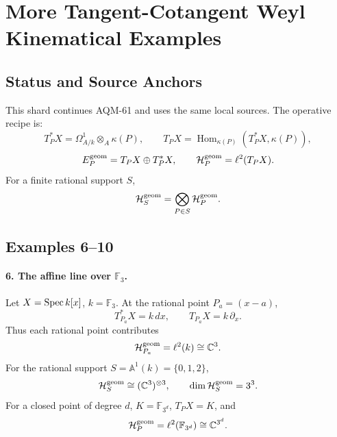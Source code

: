 
\section{More Tangent-Cotangent Weyl Kinematical Examples}
\label{sec:tangent-cotangent-weyl-kinematics-more-examples}

\subsection{Status and Source Anchors}

This shard continues AQM-61 and uses the same local sources.  The operative
recipe is:
\[
  T_P^*X=\Omega^1_{A/k}\otimes_A\kappa(P),\qquad
  T_PX=\operatorname{Hom}_{\kappa(P)}(T_P^*X,\kappa(P)),
\]
\[
  E_P^{\rm geom}=T_PX\oplus T_P^*X,\qquad
  \mathcal H_P^{\rm geom}=\ell^2(T_PX).
\]
For a finite rational support \(S\),
\[
  \mathcal H_S^{\rm geom}=\bigotimes_{P\in S}\mathcal H_P^{\rm geom}.
\]

\subsection{Examples 6--10}

\paragraph{6. The affine line over \(\mathbb F_3\).}
Let \(X=\operatorname{Spec} k[x]\), \(k=\mathbb F_3\).  At the rational point \(P_a=(x-a)\),
\[
  T_{P_a}^*X=k\,dx,\qquad T_{P_a}X=k\,\partial_x.
\]
Thus each rational point contributes
\[
  \mathcal H_{P_a}^{\rm geom}=\ell^2(k)\cong\mathbb C^3.
\]
For the rational support \(S=\mathbb A^1(k)=\{0,1,2\}\),
\[
  \mathcal H_S^{\rm geom}\cong(\mathbb C^3)^{\otimes3},
  \qquad \dim\mathcal H_S^{\rm geom}=3^3.
\]
For a closed point of degree \(d\), \(K=\mathbb F_{3^d}\), \(T_PX=K\), and
\[
  \mathcal H_P^{\rm geom}=\ell^2(\mathbb F_{3^d})
  \cong\mathbb C^{3^d}.
\]

